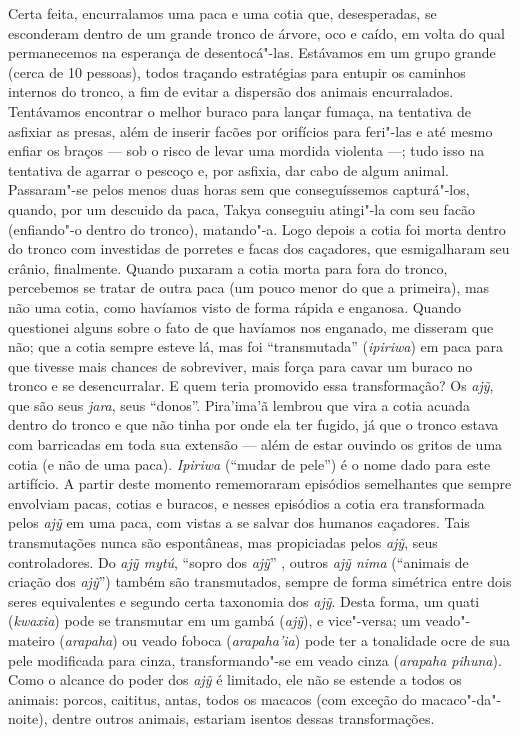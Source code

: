 Certa feita, encurralamos uma paca e uma cotia que, desesperadas, se
esconderam dentro de um grande tronco de árvore, oco e caído, em volta
do qual permanecemos na esperança de desentocá"-las. Estávamos em um
grupo grande (cerca de 10 pessoas), todos traçando estratégias para
entupir os caminhos internos do tronco, a fim de evitar a dispersão dos
animais encurralados. Tentávamos encontrar o melhor buraco para lançar
fumaça, na tentativa de asfixiar as presas, além de inserir facões por
orifícios para feri"-las e até mesmo enfiar os braços --- sob o risco de
levar uma mordida violenta ---; tudo isso na tentativa de agarrar o
pescoço e, por asfixia, dar cabo de algum animal. Passaram"-se pelos
menos duas horas sem que conseguíssemos capturá"-los, quando, por um
descuido da paca, Takya conseguiu atingi"-la com seu facão (enfiando"-o
dentro do tronco), matando"-a. Logo depois a cotia foi morta dentro do
tronco com investidas de porretes e facas dos caçadores, que
esmigalharam seu crânio, finalmente. Quando puxaram a cotia morta para
fora do tronco, percebemos se tratar de outra paca (um pouco menor do
que a primeira), mas não uma cotia, como havíamos visto de forma rápida
e enganosa. Quando questionei alguns sobre o fato de que havíamos nos
enganado, me disseram que não; que a cotia sempre esteve lá, mas foi
``transmutada'' (\emph{ipiriwa}) em paca para que tivesse mais chances de
sobreviver, mais força para cavar um buraco no tronco e se
desencurralar. E quem teria promovido essa transformação? Os \emph{ajỹ},
que são seus \emph{jara}, seus ``donos''. Pira'ima'ã lembrou que vira a
cotia acuada dentro do tronco e que não tinha por onde ela ter fugido,
já que o tronco estava com barricadas em toda sua extensão --- além de
estar ouvindo os gritos de uma cotia (e não de uma paca). \emph{Ipiriwa}
(``mudar de pele'') é o nome dado para este artifício. A partir deste
momento rememoraram episódios semelhantes que sempre envolviam pacas,
cotias e buracos, e nesses episódios a cotia era transformada pelos
\emph{ajỹ} em uma paca, com vistas a se salvar dos humanos caçadores.
Tais transmutações nunca são espontâneas, mas propiciadas pelos
\emph{ajỹ}, seus controladores. Do \emph{ajỹ mytú}, ``sopro dos
\emph{ajỹ}'' , outros \emph{ajỹ nima} (``animais de criação dos
\emph{ajỹ}'') também são transmutados, sempre de forma simétrica entre
dois seres equivalentes e segundo certa taxonomia dos \emph{ajỹ}. Desta
forma, um quati (\emph{kwaxia}) pode se transmutar em um gambá
(\emph{ajỹ}), e vice"-versa; um veado"-mateiro (\emph{arapaha}) ou veado
foboca (\emph{arapaha'ia}) pode ter a tonalidade ocre de sua pele
modificada para cinza, transformando"-se em veado cinza (\emph{arapaha
pihuna}). Como o alcance do poder dos \emph{ajỹ} é limitado, ele não se
estende a todos os animais: porcos, caititus, antas, todos os macacos
(com exceção do macaco"-da"-noite), dentre outros animais, estariam
isentos dessas transformações.

